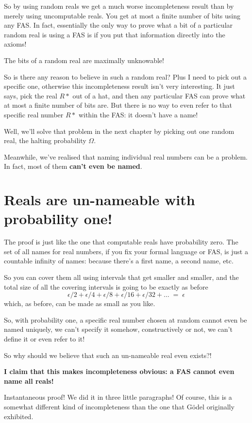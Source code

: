 \documentclass[12pt]{book}
\begin{document}
So by using random reals we get a much worse incompleteness result than by merely using
uncomputable reals.  You get at most a finite number of bits using any FAS. In fact,
essentially the only way to prove what a bit of a particular random real is using a FAS
is if you put that information directly into the axioms! 
 
The bits of a random real are maximally unknowable!
 
So is there any reason to believe in such a random real?   Plus I need to pick out a specific
one, otherwise this incompleteness result isn't very interesting.  It just says, pick
the real $R*$ out of a hat, and then any particular FAS can prove what at most a finite number of bits
are.  But there is no way to even refer to that specific real number $R*$ within the FAS: it doesn't
have a name!  
 
Well, we'll solve that problem in the next chapter by picking out one random real, the
halting probability $\Omega$.
 
Meanwhile, we've realised that naming individual real numbers can be a problem.
In fact, most of them \textbf{can't even be named}.

\section*{Reals are un-nameable with probability one!}

The proof is just like the one that computable reals have probability zero.
The set of all names for real numbers, if you fix your formal language or FAS, is just a countable
infinity of names: because there's a first name, a second name, etc.
 
So you can cover them all using intervals that get smaller and smaller, and
the total size of all the covering intervals is going to be exactly as before
\[
   \epsilon/2 + \epsilon/4 + \epsilon/8 + \epsilon/16 + \epsilon/32 + \ldots \; = \; \epsilon
\] 
which, as before, can be made as small as you like.
 
So, with probability one, a specific real number chosen at random cannot even be
named uniquely, we can't specify it somehow, constructively or not, we can't define it
or even refer to it!
 
So why should we believe that such an un-nameable real even exists?!
 
\textbf{I claim that this makes incompleteness obvious:
a FAS cannot even name all reals!}
 
Instantaneous proof! 
We did it in three little paragraphs!
Of course, this is a somewhat different kind of incompleteness than the one that G\"odel
originally exhibited.
 
\end{document}
